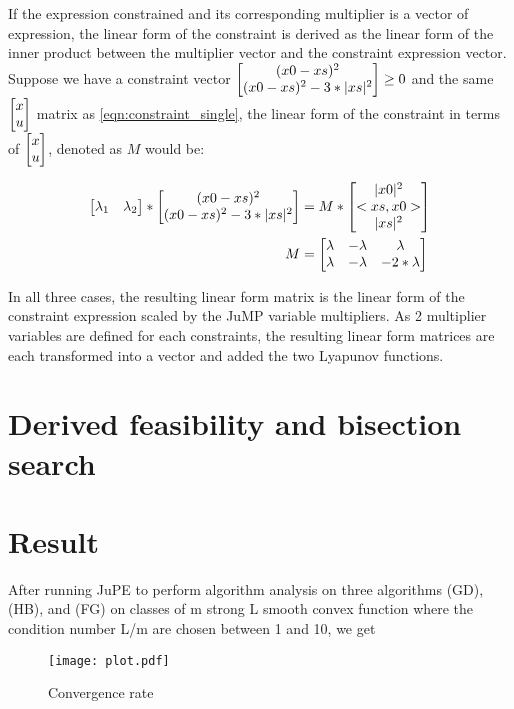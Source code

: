 If the expression constrained and its corresponding multiplier is a vector of expression, the linear form of the constraint is derived as the linear form of the inner product between the multiplier vector and the constraint expression vector. Suppose we have a constraint vector $\begin{bmatrix}(x0-xs)^2 \\ (x0-xs)^2-3*|xs|^2\end{bmatrix} \geq 0$ and the same $\begin{bmatrix}x\\ u\end{bmatrix}$ matrix as \ref{eqn:constraint_single}, the linear form of the constraint in terms of $\begin{bmatrix}x\\ u\end{bmatrix}$, denoted as $M$ would be:

\begin{subequations} \label{eqn:constraint_vector}
	\begin{align}
    \begin{bmatrix}\lambda _1 & \lambda _2\end{bmatrix} * \begin{bmatrix}(x0 - xs)^2 \\ (x0 - xs)^2-3*|xs|^2\end{bmatrix} &= M * \begin{bmatrix}|x0|^2\\ <xs, x0>\\ |xs|^2\end{bmatrix} \label{eq_cons_vector1}       \\
	M &= \begin{bmatrix}\lambda & -\lambda & \lambda \\ \lambda & -\lambda & -2*\lambda\end{bmatrix} \label{eq_cons_vector2}
	\end{align}
\end{subequations}

In all three cases, the resulting linear form matrix is the linear form of the constraint expression scaled by the JuMP variable multipliers. As 2 multiplier variables are defined for each constraints, the resulting linear form matrices are each transformed into a vector and added the two Lyapunov functions.

\section{Derived feasibility and bisection search}

\section{Result}
After running JuPE to perform algorithm analysis on three algorithms (GD), (HB), and (FG) on classes of m strong L smooth convex function where the condition number L/m are chosen between 1 and 10, we get 
\begin{figure}[h]
    \centering
    \texttt{[image: plot.pdf]}
    \caption{Convergence rate}
    \label{plot_result}
\end{figure}